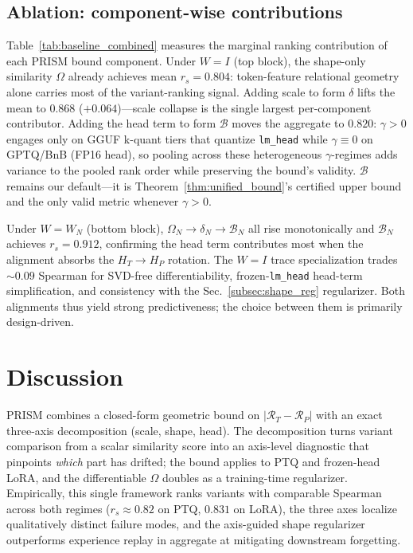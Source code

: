 \documentclass{article} %
\begin{document}
\subsection{Ablation: component-wise contributions}
\label{subsec:ablation}



Table~\ref{tab:baseline_combined} measures the marginal ranking contribution of each PRISM bound component. Under $W{=}I$ (top block), the shape-only similarity $\Omega$ already achieves mean $r_s{=}0.804$: token-feature relational geometry alone carries most of the variant-ranking signal. Adding scale to form $\delta$ lifts the mean to $0.868$ ($+0.064$)---scale collapse is the single largest per-component contributor. Adding the head term to form $\mathcal{B}$ moves the aggregate to $0.820$: $\gamma{>}0$ engages only on GGUF k-quant tiers that quantize \texttt{lm\_head} while $\gamma{\equiv}0$ on GPTQ/BnB (FP16 head), so pooling across these heterogeneous $\gamma$-regimes adds variance to the pooled rank order while preserving the bound's validity. $\mathcal{B}$ remains our default---it is Theorem~\ref{thm:unified_bound}'s certified upper bound and the only valid metric whenever $\gamma{>}0$.

Under $W{=}W_N$ (bottom block), $\Omega_N \to \delta_N \to \mathcal{B}_N$ all rise monotonically and $\mathcal{B}_N$ achieves $r_s{=}0.912$, confirming the head term contributes most when the alignment absorbs the $H_T \to H_P$ rotation. The $W{=}I$ trace specialization trades $\sim$$0.09$ Spearman for SVD-free differentiability, frozen-\texttt{lm\_head} head-term simplification, and consistency with the Sec.~\ref{subsec:shape_reg} regularizer. Both alignments thus yield strong predictiveness; the choice between them is primarily design-driven.


\section{Discussion}
\label{sec:conclusion}

PRISM combines a closed-form geometric bound on $|\mathcal{R}_T{-}\mathcal{R}_P|$ with an exact three-axis decomposition (scale, shape, head). The decomposition turns variant comparison from a scalar similarity score into an axis-level diagnostic that pinpoints \emph{which} part has drifted; the bound applies to PTQ and frozen-head LoRA, and the differentiable $\Omega$ doubles as a training-time regularizer. Empirically, this single framework ranks variants with comparable Spearman across both regimes ($r_s{\approx}0.82$ on PTQ, $0.831$ on LoRA), the three axes localize qualitatively distinct failure modes, and the axis-guided shape regularizer outperforms experience replay in aggregate at mitigating downstream forgetting.
\end{document}
